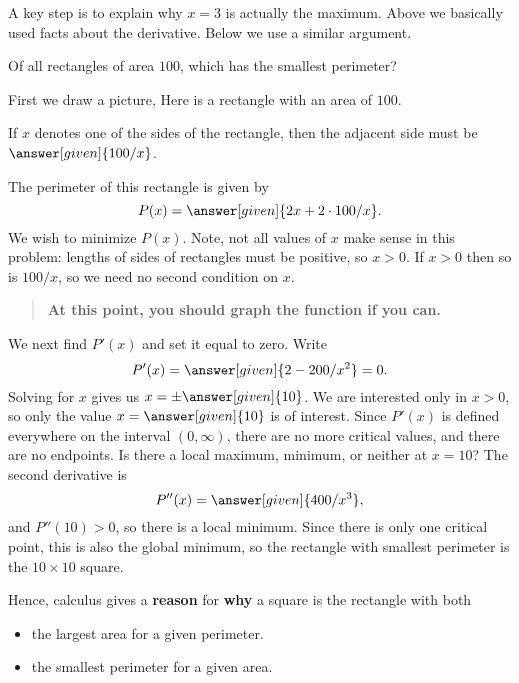 \documentclass{ximera}
\begin{document}
A key step is to explain why $x=3$ is actually the
maximum. Above we basically used facts about the derivative. Below we
use a similar argument.



\begin{example}
  Of all rectangles of area $100$, which has the smallest
  perimeter?
\begin{explanation}
  First we draw a picture, Here is a rectangle with an area of $100$.
\begin{image}
\end{image}

If $x$ denotes one of the sides of the rectangle, then the adjacent
side must be $\answer[given]{100/x}$.
 
The perimeter of this rectangle is given by
\[
P(x)=\answer[given]{2x+2\cdot 100/x}.
\]
We wish to minimize $P(x)$.  Note, not all values of $x$ make sense in
this problem: lengths of sides of rectangles must be positive, so
$x>0$. If $x>0$ then so is $100/x$, so we need no second condition on
$x$.
\begin{quote}
  \textbf{At this point, you should graph the function if you can.}
\end{quote}
We next find $P'(x)$ and set it equal to zero. Write
\[
P'(x)=\answer[given]{2-200/x^2} = 0.
\]
Solving for $x$ gives us $x=\pm \answer[given]{10}$. We are interested
only in $x>0$, so only the value $x=\answer[given]{10}$ is of
interest. Since $P'(x)$ is defined everywhere on the interval
$(0,\infty)$, there are no more critical values, and there are no
endpoints. Is there a local maximum, minimum, or neither at $x=10$?
The second derivative is
\[
P''(x)=\answer[given]{400/x^3},
\]
and $P''(10)>0$, so there is a local minimum. Since there is only one
critical point, this is also the global minimum, so the rectangle with
smallest perimeter is the $10\times10$  square.
\end{explanation}
\end{example}


Hence, calculus gives a \textbf{reason} for \textbf{why} a square is
the rectangle with both
\begin{itemize}
\item the largest area for a given perimeter.
\item the smallest perimeter for a given area.
\end{itemize}
\end{document}
